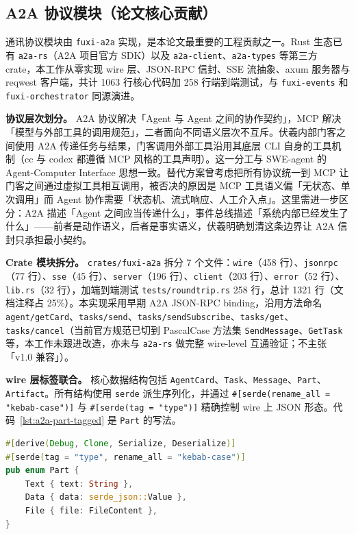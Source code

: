 \subsection{A2A 协议模块（论文核心贡献）}
\label{subsec:a2a}

通讯协议模块由 \texttt{fuxi-a2a} 实现，是本论文最重要的工程贡献之一。Rust 生态已有 \texttt{a2a-rs}（A2A 项目官方 SDK）以及 \texttt{a2a-client}、\texttt{a2a-types} 等第三方 crate\parencite{a2aproject2025a2a}，本工作从零实现 wire 层、JSON-RPC 信封、SSE 流抽象、axum 服务器与 reqwest 客户端，共计 1063 行核心代码加 258 行端到端测试，与 \texttt{fuxi-events} 和 \texttt{fuxi-orchestrator} 同源演进。

\textbf{协议层次划分。} A2A 协议解决「Agent 与 Agent 之间的协作契约」，MCP\parencite{anthropic2024mcp} 解决「模型与外部工具的调用规范」，二者面向不同语义层次不互斥。伏羲内部门客之间使用 A2A 传递任务与结果，门客调用外部工具沿用其底层 CLI 自身的工具机制（cc 与 codex 都遵循 MCP 风格的工具声明）。这一分工与 SWE-agent\parencite{yang2024sweagent} 的 Agent-Computer Interface 思想一致。替代方案曾考虑把所有协议统一到 MCP 让门客之间通过虚拟工具相互调用，被否决的原因是 MCP 工具语义偏「无状态、单次调用」而 Agent 协作需要「状态机、流式响应、人工介入点」。这里需进一步区分：A2A 描述「Agent 之间应当传递什么」，事件总线描述「系统内部已经发生了什么」——前者是动作语义，后者是事实语义，伏羲明确划清这条边界让 A2A 信封只承担最小契约。

\textbf{Crate 模块拆分。} \texttt{crates/fuxi-a2a} 拆分 7 个文件：\texttt{wire}（458 行）、\texttt{jsonrpc}（77 行）、\texttt{sse}（45 行）、\texttt{server}（196 行）、\texttt{client}（203 行）、\texttt{error}（52 行）、\texttt{lib.rs}（32 行），加端到端测试 \texttt{tests/roundtrip.rs} 258 行，总计 1321 行（文档注释占 25\%）。本实现采用早期 A2A JSON-RPC binding，沿用方法命名 \texttt{agent/getCard}、\texttt{tasks/send}、\texttt{tasks/sendSubscribe}、\texttt{tasks/get}、\texttt{tasks/cancel}（当前官方规范已切到 PascalCase 方法集 \texttt{SendMessage}、\texttt{GetTask} 等，本工作未跟进改造，亦未与 \texttt{a2a-rs} 做完整 wire-level 互通验证；不主张「v1.0 兼容」）。

\textbf{wire 层标签联合。} 核心数据结构包括 \texttt{AgentCard}、\texttt{Task}、\texttt{Message}、\texttt{Part}、\texttt{Artifact}。所有结构使用 \texttt{serde} 派生序列化，并通过 \texttt{\#[serde(rename\_all = "kebab-case")]} 与 \texttt{\#[serde(tag = "type")]} 精确控制 wire 上 JSON 形态。代码~\ref{lst:a2a-part-tagged} 是 \texttt{Part} 的写法。

\begin{lstlisting}[language=Rust, caption=Part 类型的 serde 标签联合实现, label=lst:a2a-part-tagged]
#[derive(Debug, Clone, Serialize, Deserialize)]
#[serde(tag = "type", rename_all = "kebab-case")]
pub enum Part {
    Text { text: String },
    Data { data: serde_json::Value },
    File { file: FileContent },
}
\end{lstlisting}

